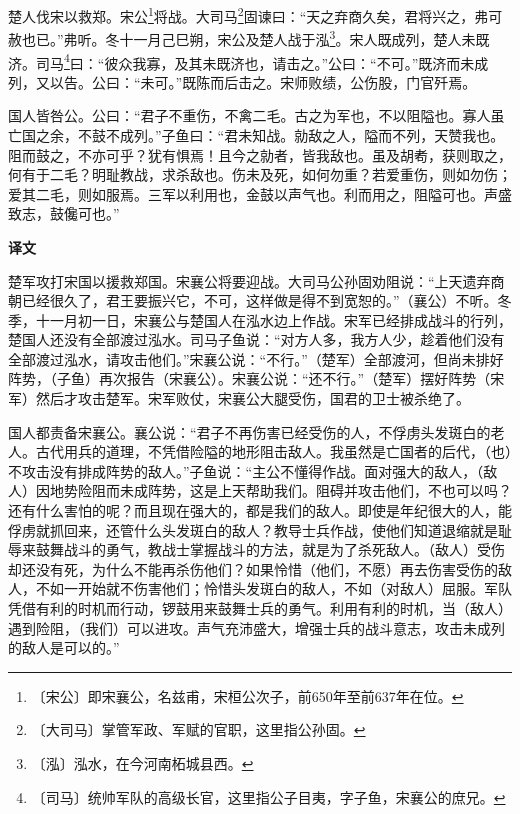 \documentclass[12pt,UTF-8,openany,a4]{ctexbook}
\begin{document}
\begin{large}
    
    楚人伐宋以救郑。宋公\footnote{〔宋公〕\yiwen 即宋襄公，名兹甫，宋桓公次子，前650年至前637年在位。}将战。大司马\footnote{〔大司马〕\yiwen 掌管军政、军赋的官职，这里指公孙固。}固谏曰：“天之弃商久矣，君将兴之，弗可赦也已。”弗听。冬十一月己巳朔，宋公及楚人战于泓\footnote{〔泓〕\yiwen 泓水，在今河南柘城县西。}。宋人既成列，楚人未既济。司马\footnote{〔司马〕\yiwen 统帅军队的高级长官，这里指公子目夷，字子鱼，宋襄公的庶兄。}曰：“彼众我寡，及其未既济也，请击之。”公曰：“不可。”既济而未成列，又以告。公曰：“未可。”既陈而后击之。宋师败绩，公伤股，门官歼焉。
    
    国人皆咎公。公曰：“君子不重伤，不禽二毛。古之为军也，不以阻隘也。寡人虽亡国之余，不鼓不成列。”子鱼曰：“君未知战。勍敌之人，隘而不列，天赞我也。阻而鼓之，不亦可乎？犹有惧焉！且今之勍者，皆我敌也。虽及胡耇，获则取之，何有于二毛？明耻教战，求杀敌也。伤未及死，如何勿重？若爱重伤，则如勿伤；爱其二毛，则如服焉。三军以利用也，金鼓以声气也。利而用之，阻隘可也。声盛致志，鼓儳可也。”
\end{large}


\newpage

\begin{Large}
    \noindent\textbf{译文}
\end{Large}


\vspace{1em}

\begin{large}
    \yiwen 
    楚军攻打宋国以援救郑国。宋襄公将要迎战。大司马公孙固劝阻说：“上天遗弃商朝已经很久了，君王要振兴它，不可，这样做是得不到宽恕的。”（襄公）不听。冬季，十一月初一日，宋襄公与楚国人在泓水边上作战。宋军已经排成战斗的行列，楚国人还没有全部渡过泓水。司马子鱼说：“对方人多，我方人少，趁着他们没有全部渡过泓水，请攻击他们。”宋襄公说：“不行。”（楚军）全部渡河，但尚未排好阵势，（子鱼）再次报告（宋襄公）。宋襄公说：“还不行。”（楚军）摆好阵势（宋军）然后才攻击楚军。宋军败仗，宋襄公大腿受伤，国君的卫士被杀绝了。
    
    国人都责备宋襄公。襄公说：“君子不再伤害已经受伤的人，不俘虏头发斑白的老人。古代用兵的道理，不凭借险隘的地形阻击敌人。我虽然是亡国者的后代，（也）不攻击没有排成阵势的敌人。”子鱼说：“主公不懂得作战。面对强大的敌人，（敌人）因地势险阻而未成阵势，这是上天帮助我们。阻碍并攻击他们，不也可以吗？还有什么害怕的呢？而且现在强大的，都是我们的敌人。即使是年纪很大的人，能俘虏就抓回来，还管什么头发斑白的敌人？教导士兵作战，使他们知道退缩就是耻辱来鼓舞战斗的勇气，教战士掌握战斗的方法，就是为了杀死敌人。（敌人）受伤却还没有死，为什么不能再杀伤他们？如果怜惜（他们，不愿）再去伤害受伤的敌人，不如一开始就不伤害他们；怜惜头发斑白的敌人，不如（对敌人）屈服。军队凭借有利的时机而行动，锣鼓用来鼓舞士兵的勇气。利用有利的时机，当（敌人）遇到险阻，（我们）可以进攻。声气充沛盛大，增强士兵的战斗意志，攻击未成列的敌人是可以的。”
    
\end{large}
\end{document}
